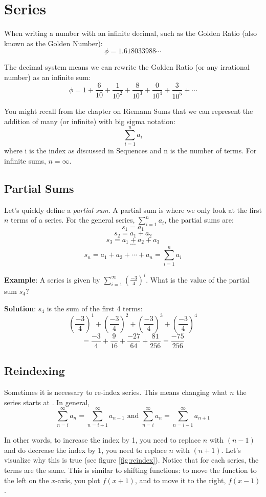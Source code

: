 \chapter{Series}
When writing a number with an infinite decimal, such as the Golden 
Ratio (also known as the Golden Number):
$$\phi = 1.618033988 \cdots$$

The decimal system means we can rewrite the Golden Ratio (or any 
irrational number) as an infinite sum:
$$\phi = 1 + \frac{6}{10} + \frac{1}{10^2} + \frac{8}{10^3} + 
\frac{0}{10^4} + \frac{3}{10^5} + \cdots$$

You might recall from the chapter on Riemann Sums that we can 
represent the addition of many (or infinite) with big sigma notation:
$$\sum_{i = 1}^n a_i$$
where i is the index as discussed in Sequences and n is the number of 
terms. For infinite sums, $n = \infty$.

\section{Partial Sums}
Let's quickly define a \textit{partial sum}. A partial sum is where 
we only look at the first $n$ terms of a series.  For the general 
series, $\sum_{i=1}^{n} a_i$, the partial sums are:
$$s_1 = a_1$$
$$s_2 = a_1 + a_2$$
$$s_3 = a_1 + a_2 + a_3$$
$$\cdots$$
$$s_n = a_1 + a_2 + \cdots + a_n = \sum_{i=1}^{n} a_i$$

\textbf{Example}: A series is given by $\sum_{i=1}^\infty 
(\frac{-3}{4})^i$. What is the value of the partial sum $s_4$?

\textbf{Solution}: $s_4$ is the sum of the first 4 terms: 
$$(\frac{-3}{4})^1 + (\frac{-3}{4})^2 + (\frac{-3}{4})^3 + (\frac{-3}{4})^4$$
$$= \frac{-3}{4} + \frac{9}{16} + \frac{-27}{64} + \frac{81}{256} = 
\frac{-75}{256}$$

\section{Reindexing}
Sometimes it is necessary to re-index series. This means changing what $n$ the 
series starts at . In general,
$$\sum_{n=i}^\infty a_n = \sum_{n=i + 1}^\infty a_{n-1} \text{ and } \sum_{n=i}^
\infty a_n = \sum_{n=i - 1}^\infty a_{n+1}$$

In other words, to increase the index by 1, you need to replace $n$ with $(n-1)$ and 
do decrease the index by 1, you need to replace $n$ with $(n+1)$. Let's 
visualize why this is true (see figure \ref{fig:reindex}). Notice that for 
each series, the terms are the same. This is similar to shifting functions: 
to move the function to the left on the $x$-axis, you plot $f(x + 1)$, and to 
move it to the right, $f(x - 1)$. 

